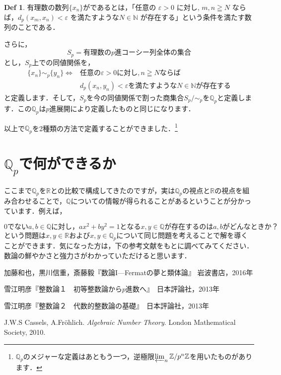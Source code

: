 \documentclass[./main]{subfiles}
\theoremstyle{definition}
\newtheorem{defi}[theo]{Def}
\newcommand{\N}{\mathbb{N}}%
\newcommand{\Z}{\mathbb{Z}}%
\newcommand{\Q}{\mathbb{Q}}%
\newcommand{\Qp}{\mathbb{Q}_p}%
\newcommand{\R}{\mathbb{R}}%
\begin{document}
\begin{defi}
	有理数の数列$\{x_n\}$がであるとは，「任意の $\varepsilon > 0$ に対し, $m,n \geqq N$ ならば，$d_p(x_m,x_n)<\varepsilon$ を満たすような$N \in \N$ が存在する」という条件を満たす数列のことである．
\end{defi}

さらに，
\[
S_p=有理数のp進コーシー列全体の集合
\]
とし，$S_p$上での同値関係を，
\begin{equation*}
	\begin{split}
	\{x_n\} \sim_p \{y_n\} \Longleftrightarrow &任意の \varepsilon > 0 に対し,  n \geqq N ならば \\
	&d_p(x_n, y_n)<\varepsilon を満たすようなN \in \N が存在する
	\end{split}
\end{equation*}
と定義します．そして，$S_p$を今の同値関係で割った商集合$S_p/{\sim_p}$を$\Qp$と定義します．この$\Qp$は$p$進展開により定義したものと同じになります．

以上で$\Qp$を2種類の方法で定義することができました．\footnote{$\Qp$のメジャーな定義はあともう一つ，逆極限$\varprojlim_n \Z / p^n\Z$を用いたものがあります．}


\section{$\Qp$で何ができるか}

ここまで$\Qp$を$\R$との比較で構成してきたのですが，実は$\Qp$の視点と$\R$の視点を組み合わせることで，$\Q$についての情報が得られることがあるということが分かっています．例えば，

\begin{equation*}
0でないa,b \in \Q に対し，ax^2+by^2=1となるx,y \in \Q が存在するのはa,bがどんなときか？
\end{equation*}
という問題は$x,y \in \R$および$x,y \in \Qp$について同じ問題を考えることで解を導くことができます．気になった方は，下の参考文献をもとに調べてみてください．数論の鮮やかさと強力さがわかっていただけると思います．

\begin{thebibliography}{9}

\item 加藤和也，黒川信重，斎藤毅『数論I---Fermatの夢と類体論』 岩波書店，2016年
\item 雪江明彦『整数論１　初等整数論から$p$進数へ』　日本評論社，2013年
\item 雪江明彦『整数論２　代数的整数論の基礎』　日本評論社，2013年
\item J.W.S Cassels, A.Fr\"ohlich. \textit{Algebraic Number Theory}. London Mathematical Society, 2010.

\end{thebibliography}
\end{document}
